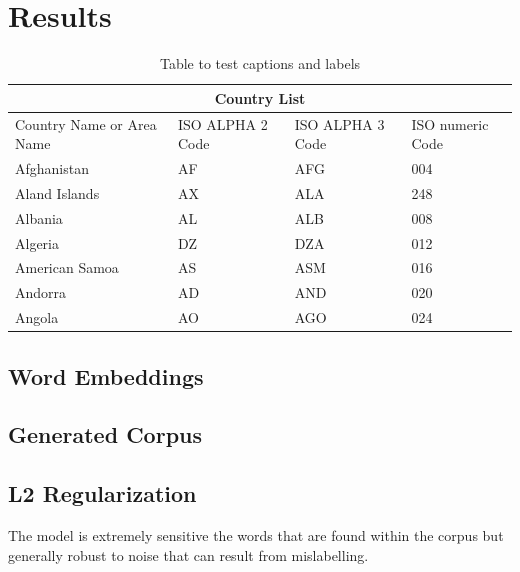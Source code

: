 \documentclass[fyp]{socreport}
\begin{document}
\section{Results}
\begin{table}[h!]
\centering
  \begin{tabular}{ |p{3cm}||p{3cm}|p{3cm}|p{3cm}|  }
   \hline
   \multicolumn{4}{|c|}{Country List} \\
   \hline
   Country Name     or Area Name& ISO ALPHA 2 Code &ISO ALPHA 3 Code&ISO numeric Code\\
   \hline
   Afghanistan   & AF    &AFG&   004\\
   Aland Islands&   AX  & ALA   &248\\
   Albania &AL & ALB&  008\\
   Algeria    &DZ & DZA&  012\\
   American Samoa&   AS  & ASM&016\\
   Andorra& AD  & AND   &020\\
   Angola& AO  & AGO&024\\
   \hline
  \end{tabular}
  \caption{Table to test captions and labels}
  \label{table:1}
\end{table}


\subsection{Word Embeddings}

\subsection{Generated Corpus}

\subsection{L2 Regularization}


The model is extremely sensitive the words that are found within the corpus but
generally robust to noise that can result from mislabelling.


\end{document}
